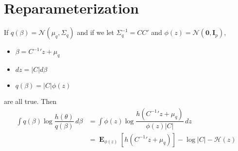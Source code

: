 \documentclass[12pt]{article}
\DeclareMathOperator{\E}{\mathbf{E}}
\begin{document}
\section{Reparameterization}
If $q(\beta)=\mathcal{N}\left(\mu_{q},\Sigma_{q}\right)$ and if we let $\Sigma_{q}^{-1}=CC'$ and $\phi(z)=\mathcal{N}(\mathbf{0},\mathbf{I}_{p})$,
\begin{itemize}
  \item $\beta={C^{-1}}'z+\mu_{q}$
  \item $dz=|C|d\beta$
  \item $q(\beta)=|C|\phi(z)$
\end{itemize}
are all true. Then
\begin{align}
  \int q(\beta)\log \dfrac{h(\theta)}{q(\beta)}\,d\beta &= \int \phi(z)\log \dfrac{h\left({C^{-1}}'z+\mu_{q} \right)}{\phi(z)|C|}\,dz\\
  &= \E_{\phi(z)}\left[h\left({C^{-1}}'z+\mu_{q}\right) \right]-\log|C|-\mathcal{H}(z)
\end{align}
\end{document}
